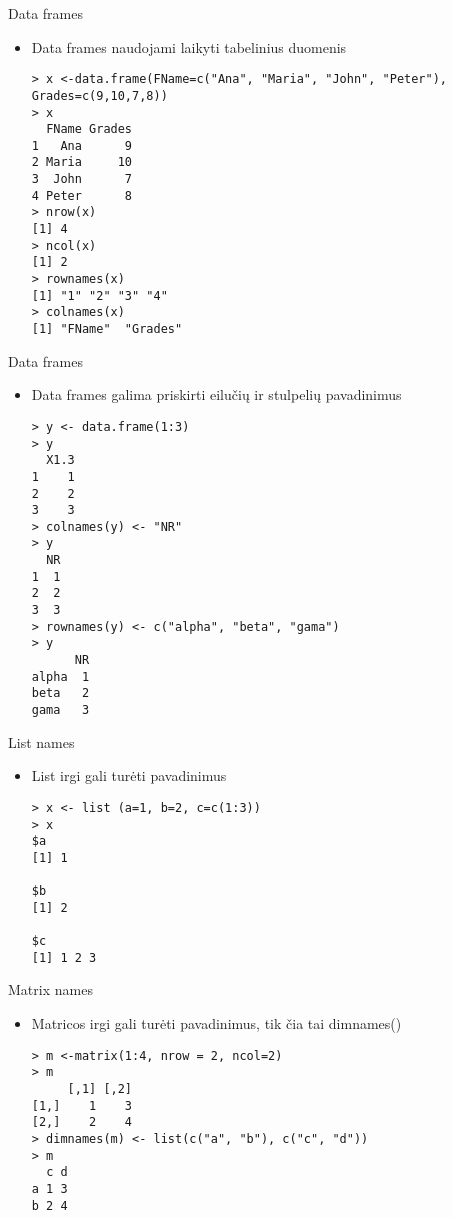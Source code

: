 \documentclass[11pt,xcolor=table]{beamer}
\begin{document}

\begin{frame}[fragile]{Data frames}
\begin{itemize}
\item Data frames naudojami laikyti tabelinius duomenis
\begin{lstlisting}
> x <-data.frame(FName=c("Ana", "Maria", "John", "Peter"), Grades=c(9,10,7,8))
> x
  FName Grades
1   Ana      9
2 Maria     10
3  John      7
4 Peter      8
> nrow(x)
[1] 4
> ncol(x)
[1] 2
> rownames(x)
[1] "1" "2" "3" "4"
> colnames(x)
[1] "FName"  "Grades"
\end{lstlisting}
\end{itemize}
\end{frame}

\begin{frame}[fragile]{Data frames}
\begin{itemize}
\item Data frames galima priskirti eilučių ir stulpelių pavadinimus
\begin{lstlisting}
> y <- data.frame(1:3)
> y
  X1.3
1    1
2    2
3    3
> colnames(y) <- "NR"
> y
  NR
1  1
2  2
3  3
> rownames(y) <- c("alpha", "beta", "gama")
> y
      NR
alpha  1
beta   2
gama   3
\end{lstlisting}
\end{itemize}
\end{frame}


\begin{frame}[fragile]{List names}
\begin{itemize}
\item List irgi gali turėti pavadinimus
\begin{lstlisting}
> x <- list (a=1, b=2, c=c(1:3))
> x
$a
[1] 1

$b
[1] 2

$c
[1] 1 2 3
\end{lstlisting}
\end{itemize}
\end{frame}


\begin{frame}[fragile]{Matrix names}
\begin{itemize}
\item Matricos irgi gali turėti pavadinimus, tik čia tai dimnames()
\begin{lstlisting}
> m <-matrix(1:4, nrow = 2, ncol=2)
> m
     [,1] [,2]
[1,]    1    3
[2,]    2    4
> dimnames(m) <- list(c("a", "b"), c("c", "d"))
> m
  c d
a 1 3
b 2 4
\end{lstlisting}
\end{itemize}
\end{frame}
\end{document}
